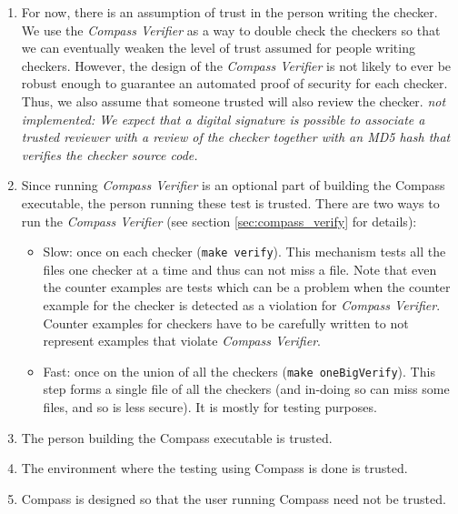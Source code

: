 \begin{enumerate}
   \item For now, there is an assumption of trust in the person writing the checker. \\
      We use the \emph{Compass Verifier} as a way to double check the 
      checkers so that we can eventually weaken the level of trust assumed for people 
      writing checkers. However, the design of the \emph{Compass Verifier} is not likely to
      ever be robust enough to guarantee an automated proof of security for each checker.  
      Thus, we also assume that someone trusted will also review the checker.
      {\em not implemented: We expect that a digital signature is possible to associate 
      a trusted reviewer with a review of the checker together with an MD5 hash that
      verifies the checker source code.}

   \item Since running \emph{Compass Verifier} is an optional part of building 
      the Compass executable, the person running these test is trusted. There are
      two ways to run the \emph{Compass Verifier} (see section \ref{sec:compass_verify}
    for details):
      \begin{itemize}
         \item Slow: once on each checker ({\tt make verify}). This mechanism
            tests all the files one checker at a time and thus can not miss 
            a file.  Note that even the counter examples are tests which can 
            be a problem when the counter example for the checker is detected
            as a violation for \emph{Compass Verifier}.  Counter examples for
            checkers have to be carefully written to not represent examples that
            violate \emph{Compass Verifier}.
         \item Fast: once on the union of all the checkers ({\tt make oneBigVerify}).
            This step forms a single file of all the checkers (and in-doing so can
            miss some files, and so is less secure).  It is mostly for testing 
            purposes.
      \end{itemize}

   \item The person building the Compass executable is trusted.

   \item The environment where the testing using Compass is done is trusted.

   \item Compass is designed so that the user running Compass need not be trusted.

\end{enumerate}

